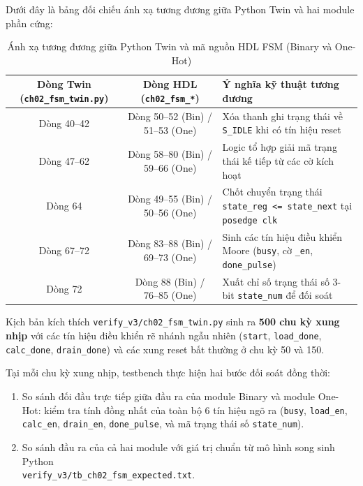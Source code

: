 Dưới đây là bảng đối chiếu ánh xạ tương đương giữa Python Twin và hai module phần cứng:

\begin{table}[htbp]
\centering
\footnotesize
\caption{Ánh xạ tương đương giữa Python Twin và mã nguồn HDL FSM (Binary và One-Hot)}
\label{tab:ch02_fsm_mapping}
\begin{tabularx}{\textwidth}{ccX}
\toprule
Dòng Twin (\texttt{ch02\_fsm\_twin.py}) & Dòng HDL (\texttt{ch02\_fsm\_*}) & Ý nghĩa kỹ thuật tương đương \\
\midrule
Dòng 40--42 & Dòng 50--52 (Bin) / 51--53 (One) & Xóa thanh ghi trạng thái về \texttt{S\_IDLE} khi có tín hiệu reset \\
Dòng 47--62 & Dòng 58--80 (Bin) / 59--66 (One) & Logic tổ hợp giải mã trạng thái kế tiếp từ các cờ kích hoạt \\
Dòng 64 & Dòng 49--55 (Bin) / 50--56 (One) & Chốt chuyển trạng thái \texttt{state\_reg <= state\_next} tại \texttt{posedge clk} \\
Dòng 67--72 & Dòng 83--88 (Bin) / 69--73 (One) & Sinh các tín hiệu điều khiển Moore (\texttt{busy}, cờ \texttt{\_en}, \texttt{done\_pulse}) \\
Dòng 72 & Dòng 88 (Bin) / 76--85 (One) & Xuất chỉ số trạng thái số 3-bit \texttt{state\_num} để đối soát \\
\bottomrule
\end{tabularx}
\end{table}

Kịch bản kích thích \texttt{verify\_v3/ch02\_fsm\_twin.py} sinh ra \textbf{500 chu kỳ xung nhịp} với các tín hiệu điều khiển rẽ nhánh ngẫu nhiên (\texttt{start}, \texttt{load\_done}, \texttt{calc\_done}, \texttt{drain\_done}) và các xung reset bất thường ở chu kỳ 50 và 150.

Tại mỗi chu kỳ xung nhịp, testbench thực hiện hai bước đối soát đồng thời:
\begin{enumerate}[leftmargin=1.5em, itemsep=2pt]
    \item So sánh đối đầu trực tiếp giữa đầu ra của module Binary và module One-Hot: kiểm tra tính đồng nhất của toàn bộ 6 tín hiệu ngõ ra (\texttt{busy}, \texttt{load\_en}, \texttt{calc\_en}, \texttt{drain\_en}, \texttt{done\_pulse}, và mã trạng thái số \texttt{state\_num}).
    \item So sánh đầu ra của cả hai module với giá trị chuẩn từ mô hình song sinh Python\\ \texttt{verify\_v3/tb\_ch02\_fsm\_expected.txt}.
\end{enumerate}

